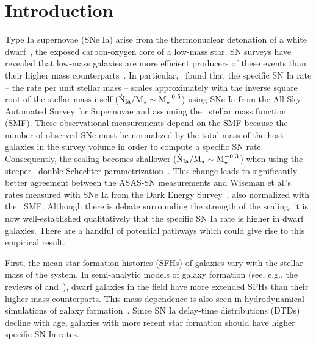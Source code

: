 \documentclass[ms.tex]{subfiles}
\begin{document}
\section{Introduction}
\label{sec:intro}

Type Ia supernovae (SNe Ia) arise from the thermonuclear detonation of a white
dwarf~\citep[WD;][]{Hoyle1960, Colgate1969}, the exposed carbon-oxygen core of
a low-mass star.
SN surveys have revealed that low-mass galaxies are more efficient producers
of these events than their higher mass counterparts~\citep[e.g.,][]{Mannucci2005,
Sullivan2006, Li2011, Smith2012}.
In particular,~\citet{Brown2019} found that the specific SN Ia rate -- the rate
per unit stellar mass -- scales approximately with the inverse square root of
the stellar mass itself ($\dot{\text{N}}_\text{Ia} / \text{M}_\star \sim \text{M}_\star^{-0.5}$)
using SNe Ia from the All-Sky Automated Survey for Supernovae
\citep[ASAS-SN;][]{Shappee2014, Kochanek2017} and assuming the~\citet{Bell2003}
stellar mass function (SMF).
These observational measurements depend on the SMF because the number of
observed SNe must be normalized by the total mass of the host galaxies in the
survey volume in order to compute a specific SN rate.
Consequently, the scaling becomes shallower ($\dot{\text{N}}_\text{Ia} / \text{M}_\star
\sim \text{M}_\star^{-0.3}$) when using the steeper~\citet{Baldry2012} double-Schechter
parametrization~\citep{Gandhi2022}.
This change leads to significantly better agreement between the ASAS-SN
measurements and Wiseman et al.'s~\citeyearpar{Wiseman2021} rates measured with
SNe Ia from the Dark Energy Survey~\citep[DES;][]{DES2016}, also normalized
with the~\citet{Baldry2012} SMF.
Although there is debate surrounding the strength of the scaling, it is now
well-established qualitatively that the specific SN Ia rate is higher in dwarf
galaxies.
There are a handful of potential pathways which could give rise to this
empirical result.
\par
First, the mean star formation histories (SFHs) of galaxies vary with the
stellar mass of the system.
In semi-analytic models of galaxy formation (see, e.g., the reviews of
\citealt{Baugh2006} and~\citealt{Somerville2015a}), dwarf galaxies in the field
have more extended SFHs than their higher mass counterparts.
This mass dependence is also seen in hydrodynamical simulations of galaxy
formation~\citep[e.g.][]{GarrisonKimmel2019}.
Since SN Ia delay-time distributions (DTDs) decline with age, galaxies with
more recent star formation should have higher specific SN Ia rates.
\par
\end{document}
